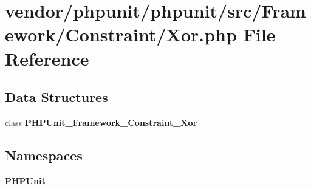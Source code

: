 \section{vendor/phpunit/phpunit/src/\+Framework/\+Constraint/\+Xor.php File Reference}
\label{_xor_8php}
\subsection*{Data Structures}
\begin{DoxyCompactItemize}
\item 
class {\bf P\+H\+P\+Unit\+\_\+\+Framework\+\_\+\+Constraint\+\_\+\+Xor}
\end{DoxyCompactItemize}
\subsection*{Namespaces}
\begin{DoxyCompactItemize}
\item 
 {\bf P\+H\+P\+Unit}
\end{DoxyCompactItemize}
